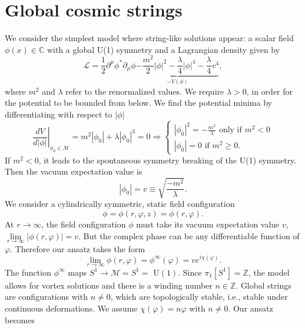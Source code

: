 \section{Global cosmic strings}\label{sec:global}
We consider the simplest model where string-like solutions appear: a scalar field $\phi(x)\in\mathbb{C}$ with a global U(1) symmetry and a Lagrangian density given by
\begin{equation}
	\mathcal{L} = \frac{1}{2}\partial^{\mu} \phi^* \partial_{\mu} \phi  \underbrace{-\frac{m^2}{2} |\phi|^2 - \frac{\lambda}{4}|\phi|^4-\frac{\lambda}{4}v^4}_{-V(\phi)} ,
\end{equation}
where $m^2$ and $\lambda$ refer to the renormalized values.
We require $\lambda>0$, in order for the potential to be bounded from below. We find the potential minima by differentiating with respect to $|\phi|$
\begin{equation}
	\left.\frac{dV}{d|\phi|}\right|_{\phi_0\in\mathcal{M}} = m^2 |\phi_0|+\lambda |\phi_0|^3 = 0 \Rightarrow \begin{cases} |\phi_0|^2 = -\frac{m^2}{\lambda} \text{ only if } m^2<0 \\ 
	|\phi_0| = 0 \text{ if } m^2 \geq 0.
	\end{cases}
\end{equation}
If $m^2 < 0$, it leads to the spontaneous symmetry breaking of the U(1) symmetry. Then the vacuum expectation value is
\begin{equation}
	|\phi_0| = v \equiv \sqrt{\frac{-m^2}{\lambda}}.
\end{equation}
We consider a cylindrically symmetric, static field configuration
\begin{equation}
	\phi = \phi(r,\varphi,z) = \phi (r,\varphi) .
\end{equation}
At $r \to \infty$, the field configuration $\phi$ must take its vacuum expectation value $v$, $\lim\limits_{r\to\infty}|\phi(r,\varphi)| = v$. But the complex phase can be any differentiable function of $\varphi$. Therefore our ansatz takes the form
\begin{equation}
	\lim_{r\to\infty}\phi(r,\varphi) = \phi^{\infty}(\varphi) = v e^{i\chi(\varphi)} . 
\end{equation}
The function $\phi^{\infty}$ maps $S^1 \to \mathcal{M} = S^1= $ U$(1)$. Since $\pi_1[S^1] = \mathbb{Z}$, the model allows for vortex solutions and there is a winding number $n\in\mathbb{Z}$. Global strings are configurations with $n\neq 0$, which are topologically stable, i.e., stable under continuous deformations. We assume $\chi(\varphi) = n\varphi$ with $n\neq 0$. Our ansatz becomes
